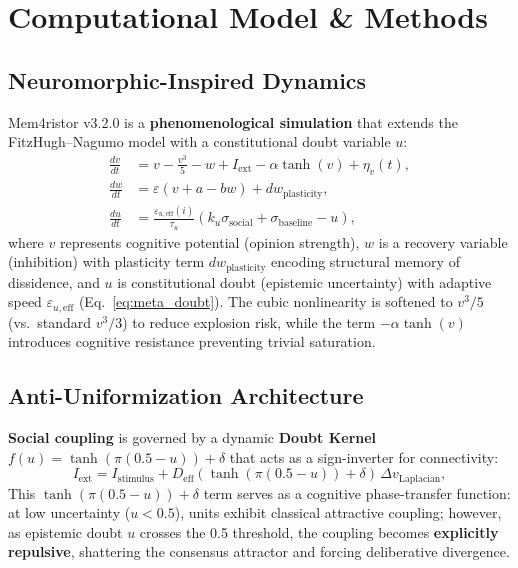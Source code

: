 \documentclass[11pt]{article}
\begin{document}
\section{Computational Model \& Methods}

\subsection{Neuromorphic-Inspired Dynamics}

Mem4ristor v3.2.0 is a \textbf{phenomenological simulation} that extends the FitzHugh--Nagumo model with a constitutional doubt variable $u$:
\begin{align}
\frac{dv}{dt} &= v - \frac{v^3}{5} - w + I_{\text{ext}} - \alpha \tanh(v) + \eta_v(t), \label{eq:dv} \\
\frac{dw}{dt} &= \varepsilon(v + a - bw) + dw_{\text{plasticity}}, \label{eq:dw} \\
\frac{du}{dt} &= \frac{\varepsilon_{u,\text{eff}}(i)}{\tau_u}(k_u \sigma_{\text{social}} + \sigma_{\text{baseline}} - u), \label{eq:du}
\end{align}
where $v$ represents cognitive potential (opinion strength), $w$ is a recovery variable (inhibition) with plasticity term $dw_{\text{plasticity}}$ encoding structural memory of dissidence, and $u$ is constitutional doubt (epistemic uncertainty) with adaptive speed $\varepsilon_{u,\text{eff}}$ (Eq.~\ref{eq:meta_doubt}). The cubic nonlinearity is softened to $v^3/5$ (vs.\ standard $v^3/3$) to reduce explosion risk, while the term $-\alpha \tanh(v)$ introduces cognitive resistance preventing trivial saturation.

\subsection{Anti-Uniformization Architecture}

\noindent\textbf{Social coupling} is governed by a dynamic \textbf{Doubt Kernel} $f(u) = \tanh(\pi(0.5-u)) + \delta$ that acts as a sign-inverter for connectivity:
\begin{equation}
I_{\text{ext}} = I_{\text{stimulus}} + D_{\text{eff}} (\tanh(\pi(0.5-u)) + \delta)\,\Delta v_{\text{Laplacian}},
\end{equation}
This $\tanh(\pi(0.5-u)) + \delta$ term serves as a cognitive phase-transfer function: at low uncertainty ($u < 0.5$), units exhibit classical attractive coupling; however, as epistemic doubt $u$ crosses the 0.5 threshold, the coupling becomes \textbf{explicitly repulsive}, shattering the consensus attractor and forcing deliberative divergence.
\end{document}
